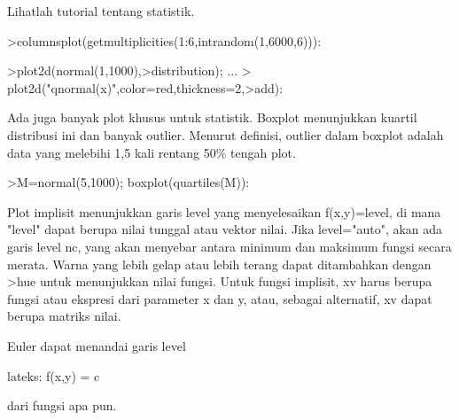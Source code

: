 \documentclass[a4paper,10pt]{article}
\begin{document}
\begin{eulernotebook}
\begin{eulercomment}
\begin{eulercomment}
\begin{eulercomment}
\begin{eulercomment}
\begin{eulercomment}
Lihatlah tutorial tentang statistik.
\end{eulercomment}
\begin{eulerprompt}
>columnsplot(getmultiplicities(1:6,intrandom(1,6000,6))):
\end{eulerprompt}
\begin{eulerprompt}
>plot2d(normal(1,1000),>distribution); ...
>  plot2d("qnormal(x)",color=red,thickness=2,>add):
\end{eulerprompt}
\begin{eulercomment}
Ada juga banyak plot khusus untuk statistik. Boxplot menunjukkan
kuartil distribusi ini dan banyak outlier. Menurut definisi, outlier
dalam boxplot adalah data yang melebihi 1,5 kali rentang 50\% tengah
plot.
\end{eulercomment}
\begin{eulerprompt}
>M=normal(5,1000); boxplot(quartiles(M)):
\end{eulerprompt}
\begin{eulercomment}
Plot implisit menunjukkan garis level yang menyelesaikan f(x,y)=level,
di mana "level" dapat berupa nilai tunggal atau vektor nilai. Jika
level="auto", akan ada garis level nc, yang akan menyebar antara
minimum dan maksimum fungsi secara merata. Warna yang lebih gelap atau
lebih terang dapat ditambahkan dengan \textgreater{}hue untuk menunjukkan nilai
fungsi. Untuk fungsi implisit, xv harus berupa fungsi atau ekspresi
dari parameter x dan y, atau, sebagai alternatif, xv dapat berupa
matriks nilai.

Euler dapat menandai garis level

lateks: f(x,y) = c

dari fungsi apa pun.


\end{eulercomment}
\end{eulercomment}
\end{eulercomment}
\end{eulercomment}
\end{eulercomment}
\end{eulernotebook}
\end{document}
